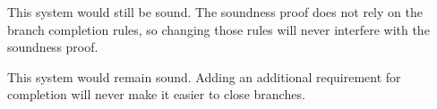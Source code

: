 \begin{earg}
\item This system would still be sound. The soundness proof does not rely on the branch completion rules, so changing those rules will never interfere with the soundness proof.
%
%	

\item This system would remain sound. Adding an additional requirement for completion will never make it easier to close branches.
%	



\end{earg}








